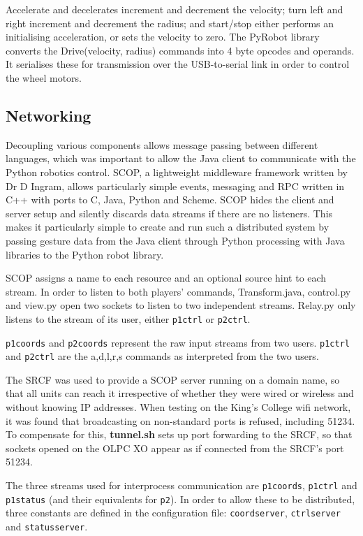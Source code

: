\documentclass[12pt,a4,notitlepage]{report}
\renewcommand{\_}{\texttt{\symbol{95}}}
\newcommand{\<}{\texttt{\symbol{60}}}
\renewcommand{\>}{\texttt{\symbol{62}}}
\newcommand{\class}[1]{\textbf{#1}}
\newcommand{\scopendpoint}[1]{\texttt{#1}}
\newcommand{\variable}[1]{\texttt{#1}}
\begin{document}
{Accelerate and decelerates increment and decrement the velocity; turn left and right increment and decrement the radius; and start/stop either performs an initialising acceleration, or sets the velocity to zero. The PyRobot library converts the Drive(velocity, radius) commands into 4 byte opcodes and operands. It serialises these for transmission over the USB-to-serial link in order to control the wheel motors.

\subsection{Networking}

Decoupling various components allows message passing between different languages, which was important to allow the Java client to communicate with the Python robotics control. SCOP, a lightweight middleware framework written by Dr D Ingram, allows particularly simple events, messaging and RPC written in C++ with ports to C, Java, Python and Scheme. SCOP hides the client and server setup and silently discards data streams if there are no listeners. This makes it particularly simple to create and run such a distributed system by passing gesture data from the Java client through Python processing with Java libraries to the Python robot library.

SCOP assigns a name to each resource and an optional source hint to each stream. In order to listen to both players' commands, Transform.java, control.py and view.py open two sockets to listen to two independent streams. Relay.py only listens to the stream of its user, either \scopendpoint{p1ctrl} or \scopendpoint{p2ctrl}.

\scopendpoint{p1coords} and \scopendpoint{p2coords} represent the raw input streams from two users.
\scopendpoint{p1ctrl} and \scopendpoint{p2ctrl} are the {a,d,l,r,s} commands as interpreted from the two users.

The SRCF was used to provide a SCOP server running on a domain name, so that all units can reach it irrespective of whether they were wired or wireless and without knowing IP addresses. When testing on the King's College wifi network, it was found that broadcasting on non-standard ports is refused, including 51234. To compensate for this, \class{tunnel.sh} sets up port forwarding to the SRCF, so that sockets opened on the OLPC XO appear as if connected from the SRCF's port 51234.

The three streams used for interprocess communication are \scopendpoint{p1coords}, \scopendpoint{p1ctrl} and \scopendpoint{p1status} (and their equivalents for \scopendpoint{p2}). In order to allow these to be distributed, three constants are defined in the configuration file: \variable{coordserver}, \variable{ctrlserver} and \variable{statusserver}. 

}
\end{document}
